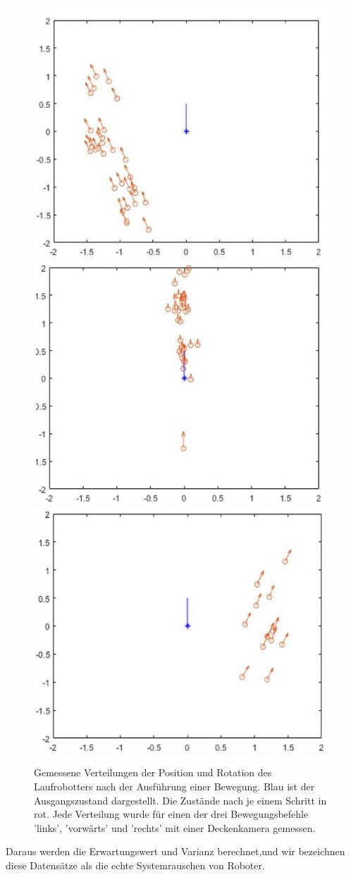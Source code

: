 \begin{figure}[ht]
	\centering
    \includegraphics[width=.32\textwidth]{Images/links.jpg}
    \includegraphics[width=.32\textwidth]{Images/vorne.jpg}
    \includegraphics[width=.32\textwidth]{Images/rechts.jpg}
	\caption{Gemessene Verteilungen der Position und Rotation des Laufrobotters nach der Ausführung einer Bewegung. Blau ist der Ausgangszustand dargestellt. Die Zustände nach je einem Schritt in rot. Jede Verteilung wurde für einen der drei Bewegungsbefehle 'links', 'vorwärts' und 'rechts' mit einer Deckenkamera gemessen.}
	\label{fig:moves}
\end{figure}

Daraus werden die Erwartungswert und Varianz berechnet,und wir bezeichnen diese Datensätze als die echte Systemrauschen von Roboter.
